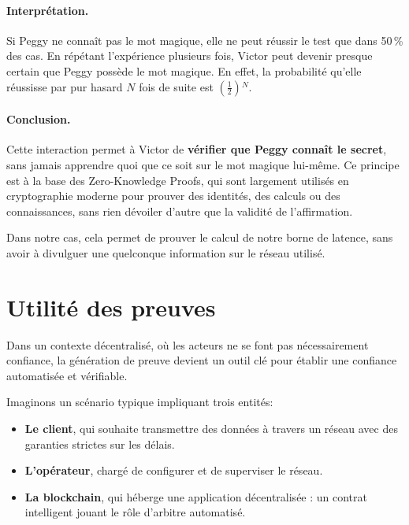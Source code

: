 \documentclass[12pt]{report}
\begin{document}
\paragraph{Interprétation.} Si Peggy ne connaît pas le mot magique, 
elle ne peut réussir le test que dans 50\,\% des cas. 
En répétant l'expérience plusieurs fois, Victor peut devenir 
presque certain que Peggy possède le mot magique. En effet, 
la probabilité qu'elle réussisse par pur hasard $N$ fois de suite 
est $\left(\frac{1}{2}\right){}^N$.

\paragraph{Conclusion.} Cette interaction permet à Victor de 
\textbf{vérifier que Peggy connaît le secret}, sans jamais 
apprendre quoi que ce soit sur le mot magique lui-même. 
Ce principe est à la base des Zero-Knowledge Proofs, qui sont 
largement utilisés en cryptographie moderne pour prouver des 
identités, des calculs ou des connaissances, sans rien dévoiler 
d'autre que la validité de l'affirmation.

\vspace{0.5cm}

Dans notre cas, cela permet de prouver le calcul de notre borne de latence,
sans avoir à divulguer une quelconque information sur le réseau utilisé.

\section*{Utilité des preuves}

Dans un contexte décentralisé, où les acteurs ne se font pas nécessairement confiance, la génération de preuve devient un outil clé pour établir une confiance automatisée et vérifiable.

\bigskip

Imaginons un scénario typique impliquant trois entités:
\begin{itemize}
    \item \textbf{Le client}, qui souhaite transmettre des données à travers un réseau avec des garanties strictes sur les délais.
    \item \textbf{L'opérateur}, chargé de configurer et de superviser le réseau.
    \item \textbf{La blockchain}, qui héberge une application décentralisée : un contrat intelligent jouant le rôle d'arbitre automatisé.
\end{itemize}
\end{document}
